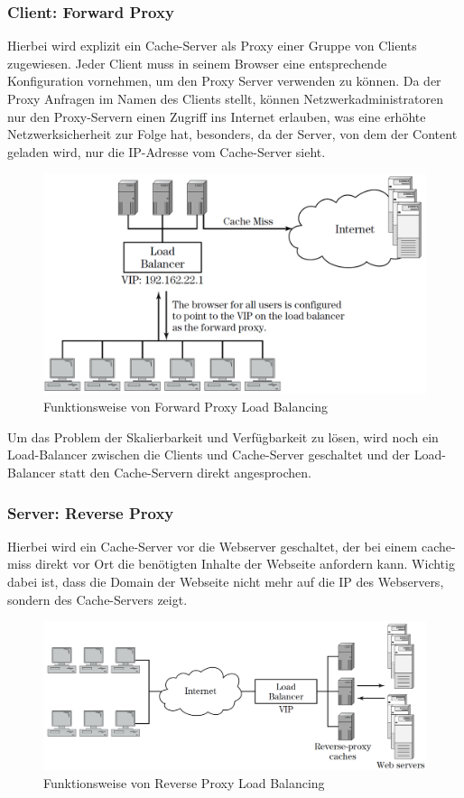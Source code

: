 \subsubsection{Client: Forward Proxy}
\label{sec:Client: Forward Proxy}
Hierbei wird explizit ein Cache-Server als Proxy einer Gruppe von Clients zugewiesen. Jeder Client muss in seinem Browser eine entsprechende Konfiguration vornehmen, um den Proxy Server verwenden zu können. Da der Proxy Anfragen im Namen des Clients stellt, können Netzwerkadministratoren nur den Proxy-Servern einen Zugriff ins Internet erlauben, was eine erhöhte Netzwerksicherheit zur Folge hat, besonders, da der Server, von dem der Content geladen wird, nur die IP-Adresse vom Cache-Server sieht.

\begin{figure}[!ht]
	\begin{center}
		\includegraphics[width=0.5\linewidth]{images/Forward_Proxy.png}
		\caption{Funktionsweise von Forward Proxy Load Balancing \cite{LoadBalancing2}}
		\label{Forward_Proxy_Load_Balancing}
	\end{center}
\end{figure}

Um das Problem der Skalierbarkeit und Verfügbarkeit zu lösen, wird noch ein Load-Balancer zwischen die Clients und Cache-Server geschaltet und der Load-Balancer statt den Cache-Servern direkt angesprochen.
\cite{LoadBalancing2}

\subsubsection{Server: Reverse Proxy}
\label{sec:Server: Reverse Proxy}
Hierbei wird ein Cache-Server vor die Webserver geschaltet, der bei einem cache-miss direkt vor Ort die benötigten Inhalte der Webseite anfordern kann. Wichtig dabei ist, dass die Domain der Webseite nicht mehr auf die IP des Webservers, sondern des Cache-Servers zeigt.

\begin{figure}[!ht]
	\begin{center}
		\includegraphics[width=0.5\linewidth]{images/Reverse_Proxy.png}
		\caption{Funktionsweise von Reverse Proxy Load Balancing \cite{LoadBalancing2}}
		\label{Reverse_Proxy_Load_Balancing}
	\end{center}
\end{figure}

